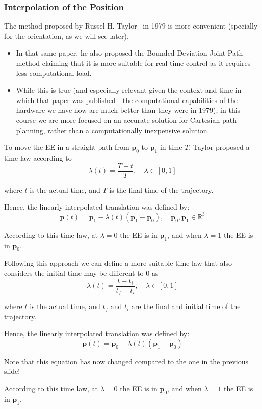 \documentclass[10pt, aspectratio=169]{beamer}
\theoremstyle{remark}
\theoremstyle{definition}
\begin{document}
\begin{frame}[allowframebreaks]
\frametitle{Interpolation of the Position}

The method proposed by Russel H. Taylor~\cite{taylor1979planning} in 1979 is more convenient (specially for the orientation, as we will see later). 

\begin{itemize}
    \item In that same paper, he also proposed the Bounded Deviation Joint Path method claiming that it is more suitable for real-time control as it requires less computational load. 
    \item While this is true (and especially relevant given the context and time in which that paper was published - the computational capabilities of the hardware we have now are much better than they were in 1979), in this course we are more focused on an accurate solution for Cartesian path planning, rather than a computationally inexpensive solution.
\end{itemize}

\framebreak

To move the EE in a straight path from $\mathbf{p}_0$ to $\mathbf{p}_1$ in time $T$, Taylor proposed a time law according to
$$
\lambda (t) = \frac{T-t}{T}, \quad  \lambda\in[0,1]
$$

where $t$ is the actual time, and $T$ is the final time of the trajectory. 

Hence, the linearly interpolated translation was defined by:
$$
\mathbf{p} (t) = \mathbf{p}_1 - \lambda (t) (\mathbf{p}_1 - \mathbf{p}_0), \quad \mathbf{p}_0, \mathbf{p}_1 \in \mathbb{R}^3
$$

According to this time law, at $\lambda = 0$ the EE is in $\mathbf{p}_1$, and when $\lambda = 1$ the EE is in $\mathbf{p}_0$.

\framebreak

Following this approach we can define \textcolor{uma_pink}{a more suitable time law} that also considers the initial time may be different to 0 as 
\begin{equation}
\lambda (t) = \frac{t-t_i}{t_f-t_i}, \quad  \lambda\in[0,1]
\label{eq:lambda}
\end{equation}

where $t$ is the actual time, and $t_f$ and $t_i$ are the final and initial time of the trajectory. 

Hence, the linearly interpolated translation was defined by:
\begin{equation}
\mathbf{p} (t) = \mathbf{p}_0 + \lambda (t) (\mathbf{p}_1 - \mathbf{p}_0)
\label{eq:p_inter}
\end{equation}

\textcolor{uma_pink}{Note that this equation has now changed compared to the one in the previous slide!}

According to this time law, at $\lambda = 0$ the EE is in $\mathbf{p}_0$, and when $\lambda = 1$ the EE is in $\mathbf{p}_1$.


\end{frame}
\end{document}
